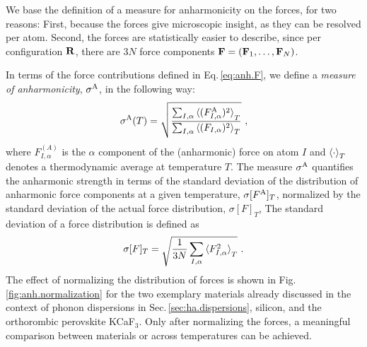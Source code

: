 We base the definition of a measure for anharmonicity on the forces, for two reasons: First, because the forces give microscopic insight, as they can be resolved per atom. Second, the forces are statistically easier to describe, since per configuration $\bf R$, there are $3N$ force components ${\bf F} = ({\bf F}_1, \ldots, {\bf F}_N)$.

In terms of the force contributions defined in Eq.\,\eqref{eq:anh.F}, we define a \emph{measure of anharmonicity}, $\sigma^\mathrm{A}$, in the following way:
\begin{align}
	\sigmaA (T)
		= \sqrt{\frac{\sum_{I, \alpha} \braket{(F^{\rm A}_{I, \alpha})^2}_T}{\sum_{I, \alpha} \braket{(F_{I, \alpha})^2}_T}}~,
	\label{eq:sigmaA}
\end{align}
where $F_{I, \alpha}^{(A)}$ is the $\alpha$ component of the (anharmonic) force on atom $I$ and $\braket{\cdot}_T$ denotes a thermodynamic average at temperature $T$. The measure $\sigma^\mathrm{A}$ quantifies the anharmonic strength in terms of the standard deviation of the distribution of anharmonic force components at a given temperature, $\sigma [F^{\rm A}]_T$, normalized by the standard deviation of the actual force distribution, $\sigma [F]_T$, The standard deviation of a force distribution is defined as
\begin{align}
	\sigma [F]_T 
		= \sqrt{\frac{1}{3N} \sum_{I, \alpha} \braket{F_{I, \alpha}^2}_T}~.
\end{align}
The effect of normalizing the distribution of forces is shown in Fig.\,\ref{fig:anh.normalization} for the two exemplary materials already discussed in the context of phonon dispersions in Sec.\,\ref{sec:ha.dispersions}, silicon, and the orthorombic perovskite KCaF$_3$. Only after normalizing the forces, a meaningful comparison between materials or across temperatures can be achieved.



